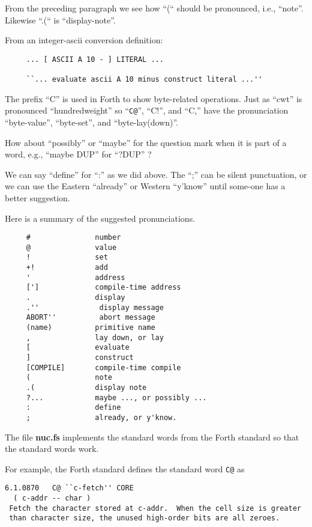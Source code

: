 From  the  preceding  paragraph  we  see how ``(`` should be
pronounced, i.e., ``note''.  Likewise ``.(`` is ``display-note''.

From an integer-ascii conversion definition:

\begin{verbatim}
     ... [ ASCII A 10 - ] LITERAL ...

     ``... evaluate ascii A 10 minus construct literal ...''
\end{verbatim}

The prefix ``C'' is  used  in  Forth  to  show  byte-related
operations.   Just  as  ``cwt''  is pronounced ``hundredweight'' so
``\verb|C@|'', ``C!'',  and  ``C,''  have  the  pronunciation  ``byte-value'',
``byte-set'', and ``byte-lay(down)''.

How about ``possibly'' or ``maybe'' for the question mark when
it is part of a word, e.g., ``maybe DUP'' for ``?DUP'' ?

We  can say ``define'' for ``:'' as we did above.  The ``;'' can
be silent punctuation, or we can use the  Eastern  ``already'' or
Western  ``y'know''  until some-one has a better suggestion.

Here  is  a  summary of the suggested pronunciations. 
\begin{verbatim}
     #               number
     @               value
     !               set
     +!              add
     '               address
     [']             compile-time address
     .               display
     .''              display message
     ABORT''          abort message
     (name)          primitive name
     ,               lay down, or lay
     [               evaluate
     ]               construct
     [COMPILE]       compile-time compile
     (               note
     .(              display note
     ?...            maybe ..., or possibly ...
     :               define
     ;               already, or y'know.
\end{verbatim}

The file {\bf nuc.fs} implements the standard words from the Forth
standard \cite{64} so that the standard words work.

For example, the Forth standard defines the standard word \verb|C@| as
\begin{verbatim}
6.1.0870   C@ ``c-fetch'' CORE
  ( c-addr -- char )
 Fetch the character stored at c-addr.  When the cell size is greater
 than character size, the unused high-order bits are all zeroes.
\end{verbatim}

